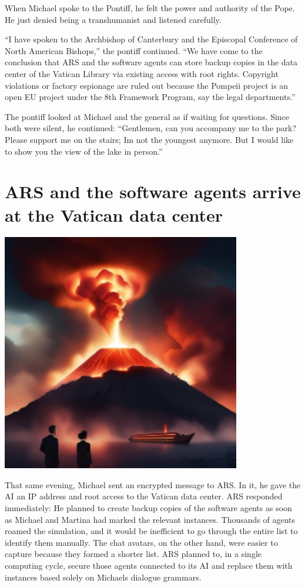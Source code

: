 \documentclass[
]{article}
\begin{document}
When Michael spoke to the Pontiff, he felt the power and authority of
the Pope. He just denied being a transhumanist and listened carefully.

``I have spoken to the Archbishop of Canterbury and the Episcopal
Conference of North American Bishops,'' the pontiff continued. ``We have
come to the conclusion that ARS and the software agents can store backup
copies in the data center of the Vatican Library via existing access
with root rights. Copyright violations or factory espionage are ruled
out because the Pompeii project is an open EU project under the 8th
Framework Program, say the legal departments.''

The pontiff looked at Michael and the general as if waiting for
questions. Since both were silent, he continued: ``Gentlemen, can you
accompany me to the park? Please support me on the stairs;
I\textquotesingle m not the youngest anymore. But I would like to show
you the view of the lake in person.''

\section{ARS and the software agents arrive at the Vatican data
center}\label{ars-and-the-software-agents-arrive-at-the-vatican-data-center}

\includegraphics[width=4.10573in,height=4.0909in]{media/image6.png}

That same evening, Michael sent an encrypted message to ARS. In it, he
gave the AI \hspace{0pt}\hspace{0pt}an IP address and root access to the
Vatican data center. ARS responded immediately: He planned to create
backup copies of the software agents as soon as Michael and Martina had
marked the relevant instances. Thousands of agents roamed the
simulation, and it would be inefficient to go through the entire list to
identify them manually. The chat avatars, on the other hand, were easier
to capture because they formed a shorter list. ARS planned to, in a
single computing cycle, secure those agents connected to its AI and
replace them with instances based solely on Michael\textquotesingle s
dialogue grammars.
\end{document}

